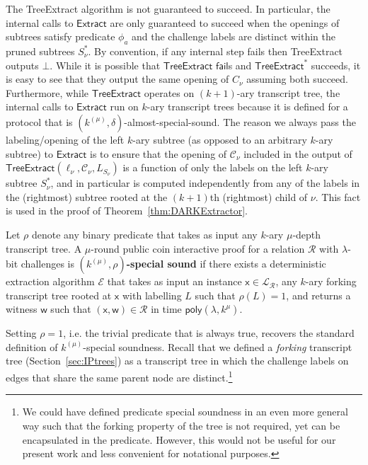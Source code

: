 The \textsf{TreeExtract} algorithm is not guaranteed to succeed. In particular, the internal calls to $\textsf{Extract}$ are only guaranteed to succeed when the openings of subtrees satisfy predicate $\phi_a$ and the challenge labels are distinct within the pruned subtrees $S^*_\nu$. By convention, if any internal step fails then \textsf{TreeExtract} outputs $\bot$. While it is possible that $\textsf{TreeExtract}$ $\mathsf{fail}$s and $\textsf{TreeExtract}^*$ succeeds, it is easy to see that they output the same opening of $C_\nu$ assuming both succeed. Furthermore, while $\textsf{TreeExtract}$ operates on $(k+1)$-ary transcript tree, the internal calls to $\textsf{Extract}$ run on $k$-ary transcript trees because it is defined for a protocol that is $(k^{(\mu)}, \delta)$-almost-special-sound. The reason we always pass the labeling/opening of the left $k$-ary subtree (as opposed to an arbitrary $k$-ary subtree) to $\textsf{Extract}$ is to ensure that the opening of $\mathcal{C}_\nu$ included in the output of $\textsf{TreeExtract}(\ell_\nu, \mathcal{C}_\nu, L_{S_\nu})$ is a function of only the labels on the left $k$-ary subtree $S^*_\nu$, and in particular is computed independently from any of the labels in the (rightmost) subtree rooted at the $(k+1)$th (rightmost) child of $\nu$. This fact is used in the proof of Theorem~\ref{thm:DARKExtractor}.

\begin{definition}
	Let $\rho$ denote any binary predicate that takes as input any $k$-ary $\mu$-depth transcript tree. A $\mu$-round public coin interactive proof for a relation $\mathcal{R}$ with $\lambda$-bit challenges is \textbf{$(k^{(\mu)}, \rho)$-special sound} if there exists a deterministic extraction algorithm $\mathcal{E}$ that takes as input an instance $\mathsf{x} \in \mathcal{L}_\mathcal{R}$, any $k$-ary forking transcript tree rooted at $\mathsf{x}$ with labelling $L$ such that $\rho(L) = 1$, and returns a witness $\mathsf{w}$ such that $(\mathsf{x}, \mathsf{w}) \in \mathcal{R}$ in time $\textsf{poly}(\lambda, k^\mu)$. 
\end{definition}

Setting $\rho = 1$, i.e. the trivial predicate that is always true, recovers the standard definition of $k^{(\mu)}$-special soundness. Recall that we defined a \emph{forking} transcript tree (Section~\ref{sec:IPtrees}) as a transcript tree in which the challenge labels on edges that share the same parent node are distinct.\footnote{We could have defined predicate special soundness in an even more general way such that the forking property of the tree is not required, yet can be encapsulated in the predicate. However, this would not be useful for our present work and less convenient for notational purposes.} 

